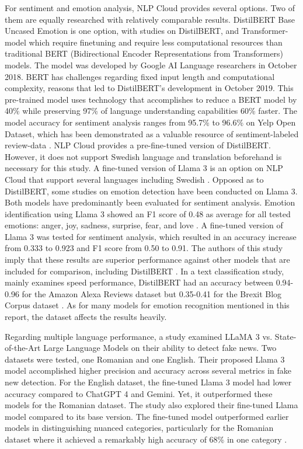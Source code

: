  For sentiment and emotion analysis, NLP Cloud provides several options. Two of them are equally researched with relatively comparable results. DistilBERT Base Uncased Emotion is one option, with studies on DistilBERT, and Transformer-model which require finetuning and require less computational resources than traditional BERT (Bidirectional Encoder Representations from Transformers) models. The model was developed by Google AI Language researchers in October 2018. BERT has challenges regarding fixed input length and computational complexity, reasons that led to DistilBERT’s development in October 2019. This pre-trained model uses technology that accomplishes to reduce a BERT model by 40\% while preserving 97\% of language understanding capabilities 60\% faster. The model accuracy for sentiment analysis ranges from 95.7\% to 96.6\% on Yelp Open Dataset, which has been demonstrated as a valuable resource of sentiment-labeled review-data \autocite{Areshey2024}. NLP Cloud provides a pre-fine-tuned version of DistilBERT. However, it does not support Swedish language and translation beforehand is necessary for this study. A fine-tuned version of Llama 3 is an option on NLP Cloud that support several languages including Swedish \autocite{NLPCloud}. Opposed as to DistilBERT, some studies on emotion detection have been conducted on Llama 3. Both models have predominantly been evaluated for sentiment analysis. Emotion identification using Llama 3 showed an F1 score of 0.48 as average for all tested emotions: anger, joy, sadness, surprise, fear, and love \autocite{Zhang2024}. A fine-tuned version of Llama 3 was tested for sentiment analysis, which resulted in an accuracy increase from 0.333 to 0.923 and F1 score from 0.50 to 0.91. The authors of this study imply that these results are superior performance against other models that are included for comparison, including DistilBERT \autocite{Kumar2024}. In a text classification study, mainly examines speed performance, DistilBERT had an accuracy between 0.94-0.96 for the Amazon Alexa Reviews dataset but 0.35-0.41 for the Brexit Blog Corpus dataset \autocite{SilvaBarbon2022}. As for many models for emotion recognition mentioned in this report, the dataset affects the results heavily. 

 Regarding multiple language performance, a study examined LLaMA 3 vs. State-of-the-Art Large Language Models on their ability to detect fake news. Two datasets were tested, one Romanian and one English. Their proposed Llama 3 model accomplished higher precision and accuracy across several metrics in fake new detection. For the English dataset, the fine-tuned Llama 3 model had lower accuracy compared to ChatGPT 4 and Gemini. Yet, it outperformed these models for the Romanian dataset. The study also explored their fine-tuned Llama model compared to its base version. The fine-tuned model outperformed earlier models in distinguishing nuanced categories, particularly for the Romanian dataset where it achieved a remarkably high accuracy of 68\% in one category \autocite{Repede2024}.

